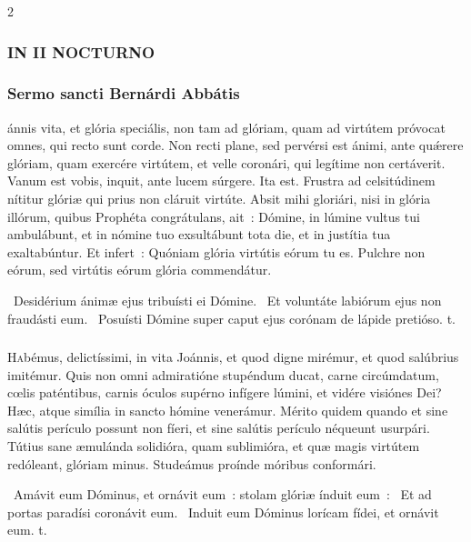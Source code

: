\documentclass[9pt,twoside]{extarticle}
\begin{document}
\begin{multicols}{2}

\normalsize
\subsubsection*{\center \small \textsc{IN II NOCTURNO}}
\subsubsection*{\center \normalfont Sermo sancti Bernárdi Abbátis\\
\small {}}
ánnis vita, et glória speciális, non tam ad glóriam, quam ad virtútem próvocat omnes, qui recto sunt corde. Non recti plane, sed pervérsi est ánimi, ante quǽrere glóriam, quam exercére virtútem, et velle coronári, qui legítime non certáverit. Vanum est vobis, inquit, ante lucem súrgere. Ita est. Frustra ad celsitúdinem nítitur glóriæ qui prius non cláruit virtúte. Absit mihi gloriári, nisi in glória illórum, quibus Prophéta congrátulans, ait~: Dómine, in lúmine vultus tui ambulábunt, et in nómine tuo exsultábunt tota die, et in justítia tua exaltabúntur. Et infert~: Quóniam glória virtútis eórum tu es. Pulchre non eórum, sed virtútis eórum glória commendátur.

~Desidérium ánimæ ejus tribuísti ei Dómine. \textred{*}~Et voluntáte labiórum ejus non fraudásti eum. ~Posuísti Dómine super caput ejus corónam de lápide pretióso. t.

\subsubsection*{\center \normalfont {}}
\lettrine{H}abémus, delictíssimi, in vita Joánnis, et quod digne mirémur, et quod salúbrius imitémur. Quis non omni admiratióne stupéndum ducat, carne circúmdatum, cœlis paténtibus, carnis óculos supérno infígere lúmini, et vidére visiónes Dei? Hæc, atque simília in sancto hómine venerámur. Mérito quidem quando et sine salútis perículo possunt non fíeri, et sine salútis perículo néqueunt usurpári. Tútius sane æmulánda solidióra, quam sublimióra, et quæ magis virtútem redóleant, glóriam minus. Studeámus proínde móribus conformári.

~Amávit eum Dóminus, et ornávit eum~: stolam glóriæ índuit eum~: \textred{*}~Et ad portas paradísi coronávit eum. ~Induit eum Dóminus lorícam fídei, et ornávit eum. t.


\end{multicols}
\end{document}
